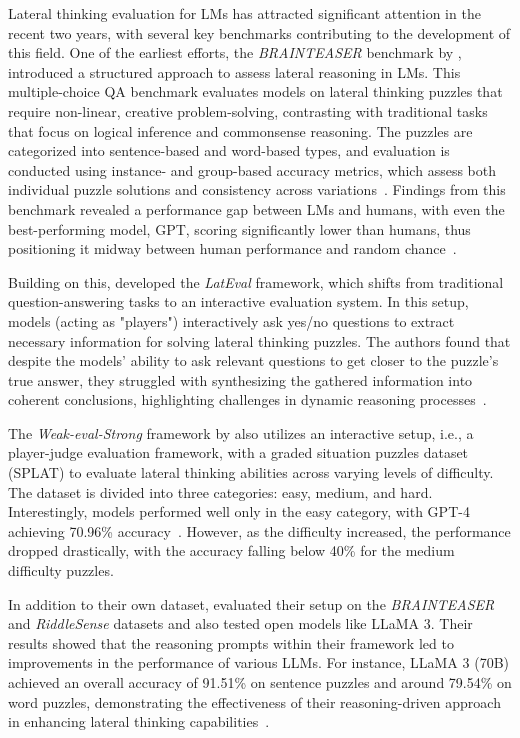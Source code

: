 Lateral thinking evaluation for \acp{LM} has attracted significant attention in the recent two years, with several key benchmarks contributing to the development of this field. One of the earliest efforts, the \textit{BRAINTEASER} benchmark by \textcite{jiangBRAINTEASERLateralThinking2023}, introduced a structured approach to assess lateral reasoning in \acp{LM}. This multiple-choice \ac{QA} benchmark evaluates models on lateral thinking puzzles that require non-linear, creative problem-solving, contrasting with traditional tasks that focus on logical inference and commonsense reasoning. The puzzles are categorized into sentence-based and word-based types, and evaluation is conducted using instance- and group-based accuracy metrics, which assess both individual puzzle solutions and consistency across variations~\cite{jiangBRAINTEASERLateralThinking2023}. Findings from this benchmark revealed a performance gap between \acp{LM} and humans, with even the best-performing model, \ac{GPT}, scoring significantly lower than humans, thus positioning it midway between human performance and random chance~\cite{jiangBRAINTEASERLateralThinking2023}.

Building on this, \textcite{huangLatEvalInteractiveLLMs2024} developed the \textit{LatEval} framework, which shifts from traditional question-answering tasks to an interactive evaluation system. In this setup, models (acting as "players") interactively ask yes/no questions to extract necessary information for solving lateral thinking puzzles. The authors found that despite the models' ability to ask relevant questions to get closer to the puzzle's true answer, they struggled with synthesizing the gathered information into coherent conclusions, highlighting challenges in dynamic reasoning processes~\cite{huangLatEvalInteractiveLLMs2024}.

The \textit{Weak-eval-Strong} framework by \textcite{chenWeakevalStrongEvaluatingEliciting2024} also utilizes an interactive setup, i.e., a player-judge evaluation framework, with a graded situation puzzles dataset (SPLAT) to evaluate lateral thinking abilities across varying levels of difficulty. The dataset is divided into three categories: easy, medium, and hard. Interestingly, models performed well only in the easy category, with \ac{GPT}-4 achieving 70.96\% accuracy~\cite{chenWeakevalStrongEvaluatingEliciting2024}. However, as the difficulty increased, the performance dropped drastically, with the accuracy falling below 40\% for the medium difficulty puzzles.

In addition to their own dataset, \textcite{chenWeakevalStrongEvaluatingEliciting2024} evaluated their setup on the \textit{BRAINTEASER} and \textit{RiddleSense} datasets and also tested open models like \ac{LLaMA} 3. Their results showed that the reasoning prompts within their framework led to improvements in the performance of various \acp{LLM}. For instance, \ac{LLaMA} 3 (70B) achieved an overall accuracy of 91.51\% on sentence puzzles and around 79.54\% on word puzzles, demonstrating the effectiveness of their reasoning-driven approach in enhancing lateral thinking capabilities~\cite{chenWeakevalStrongEvaluatingEliciting2024}.

